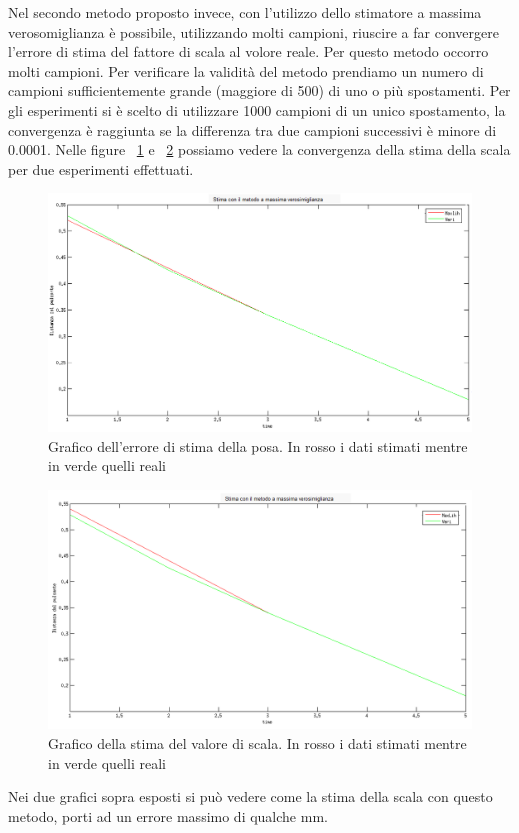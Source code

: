 Nel secondo metodo proposto invece, con l'utilizzo dello stimatore a massima verosomiglianza è possibile, utilizzando molti campioni, riuscire a far convergere l'errore di stima del fattore di scala al volore reale.
Per questo metodo occorro molti campioni. Per verificare la validità del metodo prendiamo un numero di campioni sufficientemente grande (maggiore di 500) di uno o più spostamenti. 
Per gli esperimenti si è scelto di utilizzare 1000 campioni di un unico spostamento, la convergenza è raggiunta se la differenza tra due campioni successivi è minore di 0.0001.
Nelle figure ~\ref{fig:mxli1} e ~\ref{fig:mxli2} possiamo vedere la convergenza della stima della scala per due esperimenti effettuati.
\begin{figure}[H]
   \centering
   \includegraphics[width=1.\columnwidth]{maxlih24.png}
   \caption{Grafico dell'errore di stima della posa. In rosso i dati stimati mentre in verde quelli reali}
   \label{fig:mxli1} 
\end{figure} 
\begin{figure}[H]
   \centering
   \includegraphics[width=1.\columnwidth]{maxlih28.png}
   \caption{Grafico della stima del valore di scala. In rosso i dati stimati mentre in verde quelli reali}
   \label{fig:mxli2} 
\end{figure} 
Nei due grafici sopra esposti si può vedere come la stima della scala con questo metodo, porti ad un errore massimo di qualche mm. 





